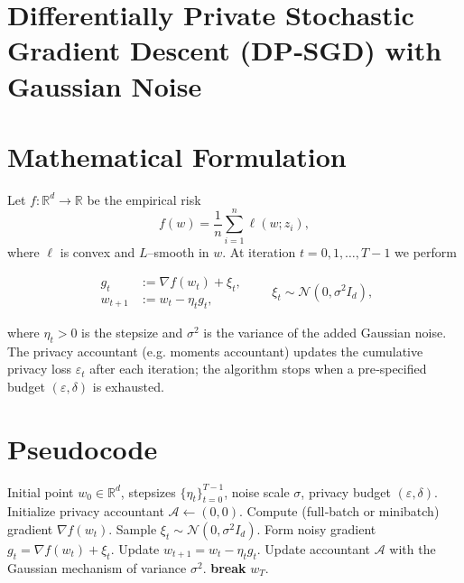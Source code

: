 \documentclass{article}
\newcommand{\R}{\mathbb{R}}
\begin{document}
\section*{Differentially Private Stochastic Gradient Descent (DP‑SGD) with Gaussian Noise}

\section*{Mathematical Formulation}
Let $f:\R^{d}\rightarrow\R$ be the empirical risk
\[
f(w)=\frac{1}{n}\sum_{i=1}^{n}\ell(w;z_i),
\]
where $\ell$ is convex and $L$–smooth in $w$.  
At iteration $t=0,1,\dots,T-1$ we perform

\[
\boxed{
\begin{aligned}
g_t &:= \nabla f(w_t)+\xi_t,\\
w_{t+1}&:= w_t-\eta_t g_t,
\end{aligned}}
\qquad \xi_t\sim\mathcal N(0,\sigma^{2}I_{d}),
\tag{1}
\]

where $\eta_t>0$ is the stepsize and $\sigma^{2}$ is the variance of the added Gaussian noise.  
The privacy accountant (e.g. moments accountant) updates the cumulative privacy loss
$\varepsilon_t$ after each iteration; the algorithm stops when a pre‑specified budget
$(\varepsilon,\delta)$ is exhausted.

\section*{Pseudocode}
\begin{algorithm}[H]
\caption{DP‑SGD with Gaussian Noise}
\begin{algorithmic}[1]
\Require Initial point $w_0\in\R^{d}$, stepsizes $\{\eta_t\}_{t=0}^{T-1}$, noise scale $\sigma$, privacy budget $(\varepsilon,\delta)$.
\State Initialize privacy accountant $\mathcal A\leftarrow (0,0)$.
    \State Compute (full‑batch or minibatch) gradient $\nabla f(w_t)$.
    \State Sample $\xi_t\sim\mathcal N(0,\sigma^{2}I_{d})$.
    \State Form noisy gradient $g_t=\nabla f(w_t)+\xi_t$.
    \State Update $w_{t+1}=w_t-\eta_t g_t$.
    \State Update accountant $\mathcal A$ with the Gaussian mechanism of variance $\sigma^{2}$.
        \State \textbf{break}
    \EndIf
\EndFor
\State \Return $w_T$.
\end{algorithmic}
\end{algorithm}
\end{document}
